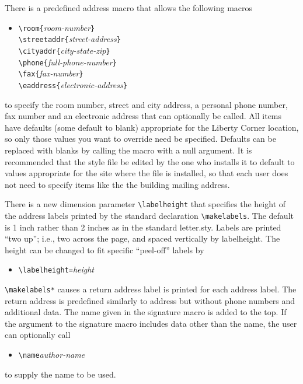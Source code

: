 There is a predefined address macro that allows the following macros
\begin{itemize}
\item[]
\verb|\room{|{\it room-number}\verb|}|\\
\verb|\streetaddr{|{\it street-address}\verb|}|\\
\verb|\cityaddr{|{\it city-state-zip}\verb|}|\\
\verb|\phone{|{\it full-phone-number}\verb|}|\\
\verb|\fax{|{\it fax-number}\verb|}|\\
\verb|\eaddress{|{\it electronic-address}\verb|}|
\end{itemize}
to specify the room number, street and city address, a personal phone
number, fax number and an 
electronic address that can optionally be called.  All items have
defaults (some default to blank) appropriate for the Liberty Corner
location, so only those values you want to override need be specified.
Defaults can be replaced with blanks by calling the macro with a null
argument.  It is recommended that the style file 
be edited by the one who installs it to default to values appropriate
for the site where the file is installed, so that 
each user does not need to specify items like the the building mailing
address.

There is a new dimension parameter \verb|\labelheight| that specifies 
the height of the address labels printed by the standard declaration
\verb|\makelabels|.  The default is 1 inch rather than 2 inches as in
the standard letter.sty.  Labels are printed ``two up''; i.e., two across
the page, and spaced vertically by labelheight.  The height can be
changed to fit specific ``peel-off'' labels by 
\begin{itemize}
\item[]
\verb|\labelheight=|{\it height}
\end{itemize}

\verb|\makelabels*| causes a return address label is printed for each
address label.  The return address is predefined similarly to address
but without phone numbers and additional data.  The name given in the
signature macro is added to the top.  If the argument to the signature
macro includes data other than the name, the user can optionally call 
\begin{itemize}
\item[]
\verb|\name|{\it author-name}
\end{itemize}
to supply the name to be used.

